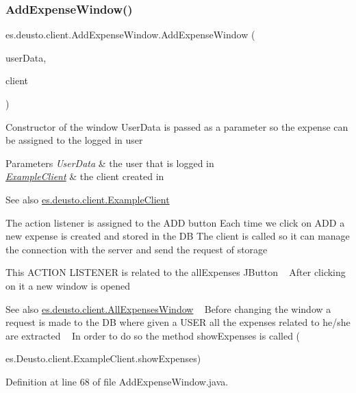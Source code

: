 \subsubsection{\texorpdfstring{Add\+Expense\+Window()}{AddExpenseWindow()}}
{\footnotesize\ttfamily es.\+deusto.\+client.\+Add\+Expense\+Window.\+Add\+Expense\+Window (\begin{DoxyParamCaption}\item[{\hyperlink{classes_1_1deusto_1_1serialization_1_1_user_data}{User\+Data}}]{user\+Data,  }\item[{\hyperlink{classes_1_1deusto_1_1client_1_1_example_client}{Example\+Client}}]{client }\end{DoxyParamCaption})}

Constructor of the window User\+Data is passed as a parameter so the expense can be assigned to the logged in user 
\begin{DoxyParams}{Parameters}
{\em User\+Data} & the user that is logged in \\
\hline
{\em \hyperlink{classes_1_1deusto_1_1client_1_1_example_client}{Example\+Client}} & the client created in \\
\hline
\end{DoxyParams}
\begin{DoxySeeAlso}{See also}
\hyperlink{classes_1_1deusto_1_1client_1_1_example_client}{es.\+deusto.\+client.\+Example\+Client} 
\end{DoxySeeAlso}
The action listener is assigned to the A\+DD button Each time we click on A\+DD a new expense is created and stored in the DB The client is called so it can manage the connection with the server and send the request of storage

This A\+C\+T\+I\+ON L\+I\+S\+T\+E\+N\+ER is related to the all\+Expenses J\+Button ~\newline
After clicking on it a new window is opened \begin{DoxySeeAlso}{See also}
\hyperlink{classes_1_1deusto_1_1client_1_1_all_expenses_window}{es.\+deusto.\+client.\+All\+Expenses\+Window} ~\newline
Before changing the window a request is made to the DB where given a U\+S\+ER all the expenses related to he/she are extracted ~\newline
In order to do so the method show\+Expenses is called (

es.\+Deusto.\+client.\+Example\+Client.\+show\+Expenses)
\end{DoxySeeAlso}


Definition at line 68 of file Add\+Expense\+Window.\+java.



